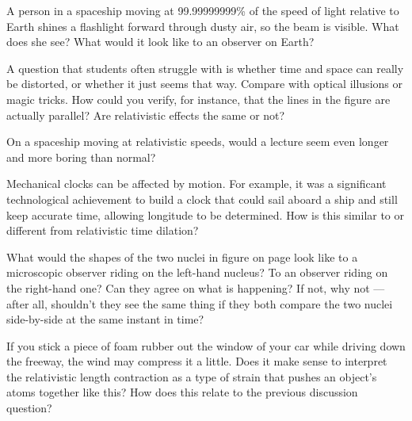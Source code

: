 \dqheader
\begin{dq}
A person in a spaceship moving at 99.99999999\% of the
speed of light relative to Earth shines a flashlight forward
through dusty air, so the beam is visible. What does she
see? What would it look like to an observer on Earth?
\end{dq}
%
\begin{dq}\label{dq:illusion}
A question that students often struggle with is whether
time and space can really be distorted, or whether it just
seems that way. Compare with optical illusions or magic
tricks. How could you verify, for instance, that the lines
in the figure are actually parallel? Are relativistic
effects the same or not?
\end{dq}
%
\begin{dq}
On a spaceship moving at relativistic speeds, would a
lecture seem even longer and more boring than normal?
\end{dq}
%
\begin{dq}
Mechanical clocks can be affected by motion. For example,
it was a significant technological achievement to build a
clock that could sail aboard a ship and still keep accurate
time, allowing longitude to be determined. How is this
similar to or different from relativistic time dilation?
\end{dq}
%
\begin{dq}
What would the shapes of the two nuclei in figure  on page \pageref{fig:rhic}
look like to a microscopic observer riding on the
left-hand nucleus? To an observer riding on the right-hand
one? Can they agree on what is happening? If not, why not
--- after all, shouldn't they see the same thing if they
both compare the two nuclei side-by-side at the same instant in time?
\end{dq}
%
\begin{dq}
If you stick a piece of foam rubber out the window of
your car while driving down the freeway, the wind may
compress it a little. Does it make sense to interpret the
relativistic length contraction as a type of strain that
pushes an object's atoms together like this? How does this
relate to the previous discussion question?
\end{dq}

\vfill\pagebreak[4]


